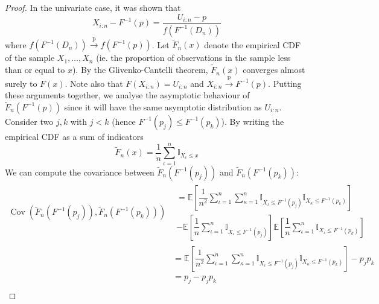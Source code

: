 \documentclass[11pt]{report} %
\begin{document}
\begin{proof}
In the univariate case, it was shown that
\begin{equation}
X_{i:n} - F^{-1}\left(p\right) = \dfrac{U_{i:n} - p}{f\left(F^{-1}\left(D_{n}\right)\right)}
\end{equation}
where $f\left(F^{-1}\left(D_{n}\right)\right) \overset{\mathrm{p}}{\to} f\left(F^{-1}\left(p\right)\right)$. Let $\widetilde{F}_{n}\left(x\right)$ denote the empirical CDF of the sample $X_{1}, \dots, X_{n}$ (ie. the proportion of observations in the sample less than or equal to $x$). By the Glivenko-Cantelli theorem, $\widetilde{F}_{n}\left(x\right)$ converges almost surely to $F\left(x\right)$. Note also that $F\left(X_{i:n}\right) = U_{i:n}$ and $X_{i:n} \overset{\mathrm{p}}{\to} F^{-1}\left(p\right)$. Putting these arguments together, we analyse the asymptotic behaviour of $\widetilde{F}_{n}\left(F^{-1}\left(p\right)\right)$ since it will have the same asymptotic distribution as $U_{i:n}$. Consider two $j, k$ with $j < k$ (hence $F^{-1}\left(p_{j}\right) \leq F^{-1}\left(p_{k}\right)$). By writing the empirical CDF as a sum of indicators
\begin{equation}
\widetilde{F}_{n}\left(x\right) = \dfrac{1}{n}\sum_{\iota = 1}^{n}\mathbb{I}_{X_{\iota} \leq x}
\end{equation}
We can compute the covariance between $\widetilde{F}_{n}\left(F^{-1}\left(p_{j}\right)\right)$ and $\widetilde{F}_{n}\left(F^{-1}\left(p_{k}\right)\right)$:
\begin{align}
\operatorname{Cov}\left(\widetilde{F}_{n}\left(F^{-1}\left(p_{j}\right)\right), \widetilde{F}_{n}\left(F^{-1}\left(p_{k}\right)\right)\right) & \begin{multlined}
= \mathbb{E}\left[\dfrac{1}{n^{2}}\sum_{\iota = 1}^{n}\sum_{\kappa = 1}^{n}\mathbb{I}_{X_{\iota} \leq F^{-1}\left(p_{j}\right)}\mathbb{I}_{X_{\kappa} \leq F^{-1}\left(p_{k}\right)}\right] \\
- \mathbb{E}\left[\dfrac{1}{n}\sum_{\iota = 1}^{n}\mathbb{I}_{X_{\iota} \leq F^{-1}\left(p_{j}\right)}\right]\mathbb{E}\left[\dfrac{1}{n}\sum_{\iota = 1}^{n}\mathbb{I}_{X_{\iota} \leq F^{-1}\left(p_{k}\right)}\right]
\end{multlined}\\
&= \mathbb{E}\left[\dfrac{1}{n^{2}}\sum_{\iota = 1}^{n}\sum_{\kappa = 1}^{n}\mathbb{I}_{X_{\iota} \leq F^{-1}\left(p_{j}\right)}\mathbb{I}_{X_{\kappa} \leq F^{-1}\left(p_{k}\right)}\right] - p_{j}p_{k} \\
&= p_{j} - p_{j}p_{k} \\

\end{align}
\end{proof}
\end{document}
